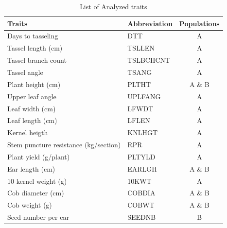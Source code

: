 \documentclass[12pt]{article}
\begin{document}
\begin{table}[ht]
  \begin{center}
{\fontsize{10}{10}\sf
\caption[]{List of Analyzed traits}
\begin{tabular}{llc} \hline
\toprule
Traits & Abbreviation & Populations \\	 \hline\hline
Days to tasseling	&	DTT	&	A	\\
Tassel length (cm)	&	TSLLEN	&	A	\\
Tassel branch count	&	TSLBCHCNT	&	A	\\
Tassel angle	&	TSANG	&	A	\\
Plant height (cm)	&	PLTHT	&	A \& B	\\
Upper leaf angle	&	UPLFANG	&	A	\\
Leaf width (cm)	&	LFWDT	&	A	\\
Leaf length (cm)	&	LFLEN	&	A	\\
Kernel heigth	&	KNLHGT	&	A	\\
Stem puncture resistance (kg/section)	&	RPR	&	A	\\
Plant yield (g/plant)	&	PLTYLD	&	A	\\
Ear length (cm)	&	EARLGH	&	A \& B	\\
10 kernel weight (g)	&	10KWT	&	A	\\
Cob diameter (cm)	&	COBDIA	&	A \& B	\\
Cob weight (g)	&	COBWT	&	A \& B	\\
Seed number per ear	&	SEEDNB	&	B	\\
\bottomrule
\end{tabular}
\label{Traits}  
}
  \end{center}
\end{table}
\end{document}
